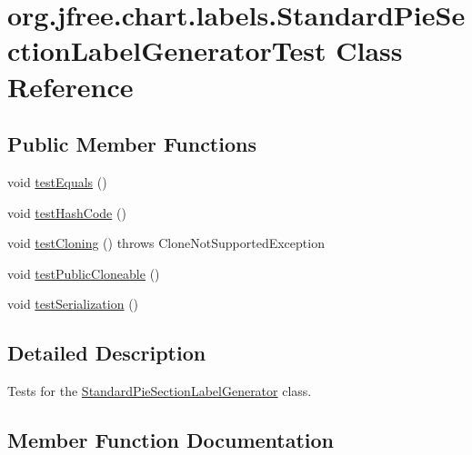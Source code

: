 \hypertarget{classorg_1_1jfree_1_1chart_1_1labels_1_1_standard_pie_section_label_generator_test}{}\section{org.\+jfree.\+chart.\+labels.\+Standard\+Pie\+Section\+Label\+Generator\+Test Class Reference}
\label{classorg_1_1jfree_1_1chart_1_1labels_1_1_standard_pie_section_label_generator_test}
\subsection*{Public Member Functions}
\begin{DoxyCompactItemize}
\item 
void \mbox{\hyperlink{classorg_1_1jfree_1_1chart_1_1labels_1_1_standard_pie_section_label_generator_test_a7a0635f0ab9bd14d9b9c3773873c958b}{test\+Equals}} ()
\item 
void \mbox{\hyperlink{classorg_1_1jfree_1_1chart_1_1labels_1_1_standard_pie_section_label_generator_test_a92a4801aa81fcd8c9468098a017a2471}{test\+Hash\+Code}} ()
\item 
void \mbox{\hyperlink{classorg_1_1jfree_1_1chart_1_1labels_1_1_standard_pie_section_label_generator_test_a98bec62c77b741c7dcc762b5a06d805a}{test\+Cloning}} ()  throws Clone\+Not\+Supported\+Exception 
\item 
void \mbox{\hyperlink{classorg_1_1jfree_1_1chart_1_1labels_1_1_standard_pie_section_label_generator_test_a044513f3efa62ce392c1390d2a042636}{test\+Public\+Cloneable}} ()
\item 
void \mbox{\hyperlink{classorg_1_1jfree_1_1chart_1_1labels_1_1_standard_pie_section_label_generator_test_af3702523300a89e263e4f065dc5a2246}{test\+Serialization}} ()
\end{DoxyCompactItemize}


\subsection{Detailed Description}
Tests for the \mbox{\hyperlink{classorg_1_1jfree_1_1chart_1_1labels_1_1_standard_pie_section_label_generator}{Standard\+Pie\+Section\+Label\+Generator}} class. 

\subsection{Member Function Documentation}
\mbox{\label{classorg_1_1jfree_1_1chart_1_1labels_1_1_standard_pie_section_label_generator_test_a98bec62c77b741c7dcc762b5a06d805a}} 

